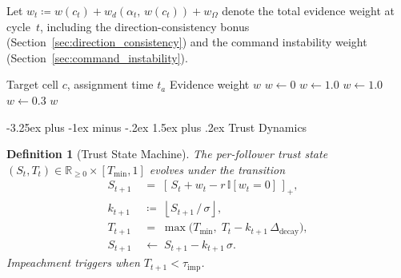 \documentclass[conference]{IEEEtran}
\makeatletter
\newtheorem{definition}{Definition}
\newcommand{\Ind}{\mathbb{I}}
\newcommand{\clip}[1]{\left[#1\right]_+}
\newcommand{\defeq}{\coloneqq}
\renewcommand{\subsection}{\@startsection{subsection}{2}{\z@}%
  {-3.25ex plus -1ex minus -.2ex}%
  {1.5ex plus .2ex}%
  {\normalfont\normalsize\itshape\centering}}
\makeatother
\begin{document}
Let $w_t \defeq w(c_t) + w_d(\alpha_t,\, w(c_t)) + w_{\Omega}$ denote the total evidence weight at cycle~$t$, including the direction-consistency bonus (Section~\ref{sec:direction_consistency}) and the command instability weight (Section~\ref{sec:command_instability}).

\begin{algorithm}[h]
\caption{Three-Tier Evidence Weighting}
\label{alg:evidence}
\begin{algorithmic}[1]
\REQUIRE Target cell $c$, assignment time $t_a$
\ENSURE Evidence weight $w$
\STATE $w \leftarrow 0$
    \STATE $w \leftarrow 1.0$
    \STATE $w \leftarrow 1.0$
    \STATE $w \leftarrow 0.3$
\ENDIF
\RETURN $w$
\end{algorithmic}
\end{algorithm}

\subsection{Trust Dynamics}
\label{sec:trust_dynamics}

\begin{definition}[Trust State Machine]
\label{def:trust_sm}
The per-follower trust state $(S_t, T_t)\in\mathbb{R}_{\geq 0}\times[T_{\min},1]$ evolves under the transition
\begin{align}
S_{t+1} &\;=\; \clip{\,S_t + w_t - r\,\Ind[w_t=0]\,},
\label{eq:suspicion_compact}\\
k_{t+1} &\;\defeq\; \left\lfloor S_{t+1}\,/\,\sigma \right\rfloor,
\label{eq:crossings}\\
T_{t+1} &\;=\; \max\!\bigl(T_{\min},\;
         T_t - k_{t+1}\,\Delta_{\text{decay}}\bigr),
\label{eq:trust_compact}\\
S_{t+1} &\;\leftarrow\; S_{t+1} - k_{t+1}\,\sigma.
\label{eq:residual}
\end{align}
Impeachment triggers when $T_{t+1} < \tau_{\text{imp}}$.
\end{definition}
\end{document}
